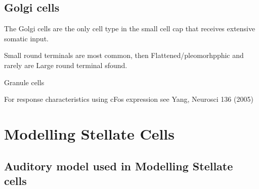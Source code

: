 \documentclass[10pt,a4paper]{article}
\begin{document}
\subsection{Golgi cells}
\citep{Cant:1993,MugnainiOsenEtAl:1980}

The Golgi cells are the only cell type in the small cell cap that receives
extensive somatic input.

Small round terminals are most common, then Flattened/pleomorhpphic and rarely
are Large round terminal sfound.

Granule cells

For response characteristics using cFos expression see Yang, Neurosci 136 (2005)

\section{Modelling Stellate Cells}
\subsection{Auditory model used in Modelling Stellate cells}
\end{document}
